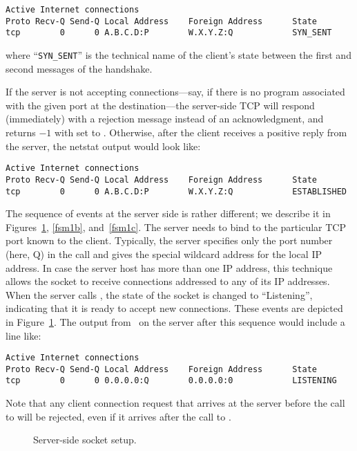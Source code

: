 \begin{verbatim}
Active Internet connections
Proto Recv-Q Send-Q Local Address    Foreign Address      State      
tcp        0      0 A.B.C.D:P        W.X.Y.Z:Q            SYN_SENT
\end{verbatim}
where ``\verb+SYN_SENT+'' is the technical name of the client's state
between the first and second messages of the handshake.

If the
server is not accepting connections---say, if there is no program
associated with the given port at the destination---the server-side
TCP will respond (immediately) with a rejection message instead of an
acknowledgment, and  returns $-1$ with  set
to .
%
Otherwise, after the client receives a positive reply from the server,
the netstat output would look like:
\begin{verbatim}
Active Internet connections
Proto Recv-Q Send-Q Local Address    Foreign Address      State      
tcp        0      0 A.B.C.D:P        W.X.Y.Z:Q            ESTABLISHED
\end{verbatim}

The sequence of events at the server side is rather different; we
describe it in Figures~\ref{fsm1a}, \ref{fsm1b}, and~\ref{fsm1c}.
The server needs to bind to the particular TCP port
known to the client. Typically, the server specifies only the
port number (here, Q)
in the  call and gives the special
wildcard address
 for the local IP address.
In case the server host has more than one IP address, this technique allows the
socket to receive connections addressed to any of its IP addresses.
When the server calls , the state of the socket is changed to
``Listening'', indicating that it is ready to accept new connections.
%
These events are depicted in Figure~\ref{fsm1a}.
The output from \netstat\ on the server after this sequence
would include a line like:
\begin{verbatim}
Active Internet connections
Proto Recv-Q Send-Q Local Address    Foreign Address      State      
tcp        0      0 0.0.0.0:Q        0.0.0.0:0            LISTENING
\end{verbatim}
%
Note that any client
connection request that arrives at the server before the
call to  will be rejected, even if it arrives
after the call to .

\begin{figure}
\caption{\label{fsm1a}Server-side socket setup.}
\end{figure}

